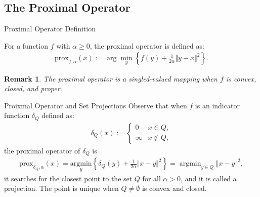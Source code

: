 \documentclass[11pt]{beamer}
\DeclareMathOperator {\argmin}{argmin}
\newtheorem{remark}{Remark}
\begin{document}
    \subsection{The Proximal Operator}
        \begin{frame}{Proximal Operator Definition}
            \begin{definition}
                For a function $f$ with $\alpha \ge 0$, the proximal operator is defined as: 
                \begin{align*}
                    \text{prox}_{f, \alpha}(x) := 
                    \arg\min_{y}\left\lbrace
                        f(y) + \frac{1}{2\alpha} \Vert y - x\Vert^2
                    \right\rbrace. 
                \end{align*}
            \end{definition}  
            \begin{remark}
                The proximal operator is a singled-valued mapping when $f$ is convex, closed, and proper. 
            \end{remark}
        \end{frame}
        \begin{frame}{Proixmal Operator and Set Projections}
            Observe that when $f$ is an indicator function $\delta_Q$ defined as: 
            \begin{align*}
                \delta_Q(x) := 
                \begin{cases}
                    0 & x \in Q,
                    \\
                    \infty  & x \not \in Q, 
                \end{cases}
            \end{align*}
            the proximal operator of $\delta_Q$ is
            \begin{align*}
               \text{prox}_{\delta_Q, \alpha}(x)=\underset{y}{\text{argmin}}
               \left\lbrace
                    \delta_Q(y) + \frac{1}{2\alpha}\Vert x - y\Vert^2
               \right\rbrace = \argmin_{y\in Q}\Vert x - y\Vert^2,
            \end{align*}
            it searches for the closest point to the set $Q$ for all $\alpha > 0$, and it is called a projection. The point is unique when $Q\neq \emptyset$ is convex and closed.
        \end{frame}
\end{document}
